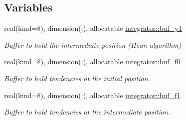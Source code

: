 \subsection*{Variables}
\begin{DoxyCompactItemize}
\item 
real(kind=8), dimension(\+:), allocatable \hyperlink{namespaceintegrator_ad82fcb5f12f76e9009ccd172f2ffa6b0}{integrator\+::buf\+\_\+y1}
\begin{DoxyCompactList}\small\item\em Buffer to hold the intermediate position (Heun algorithm) \end{DoxyCompactList}\item 
real(kind=8), dimension(\+:), allocatable \hyperlink{namespaceintegrator_aefe58ac9a698ca7d0440dcaf6103feea}{integrator\+::buf\+\_\+f0}
\begin{DoxyCompactList}\small\item\em Buffer to hold tendencies at the initial position. \end{DoxyCompactList}\item 
real(kind=8), dimension(\+:), allocatable \hyperlink{namespaceintegrator_acabd8820aca8c50aac234c5d404493b4}{integrator\+::buf\+\_\+f1}
\begin{DoxyCompactList}\small\item\em Buffer to hold tendencies at the intermediate position. \end{DoxyCompactList}\end{DoxyCompactItemize}
